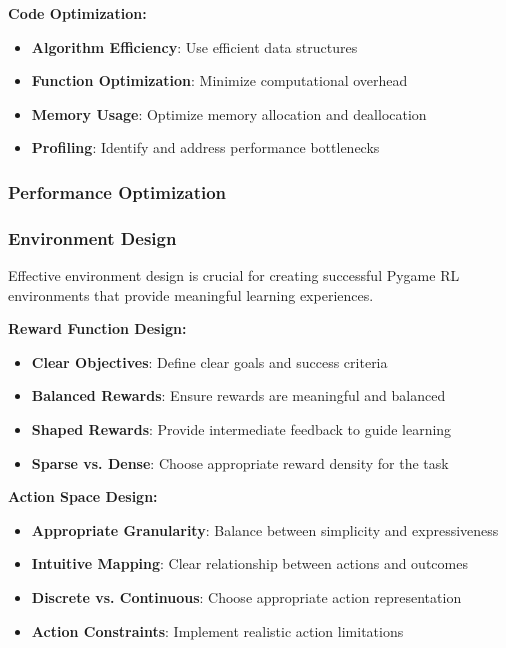 \documentclass[12pt]{article}
\begin{document}
{{{\textbf{Code Optimization:}
\begin{itemize}
    \item \textbf{Algorithm Efficiency}: Use efficient data structures
    \item \textbf{Function Optimization}: Minimize computational overhead
    \item \textbf{Memory Usage}: Optimize memory allocation and deallocation
    \item \textbf{Profiling}: Identify and address performance bottlenecks
\end{itemize}

\subsubsection{Performance Optimization}

\subsubsection{Environment Design}

Effective environment design is crucial for creating successful Pygame RL environments that provide meaningful learning experiences.

\textbf{Reward Function Design:}
\begin{itemize}
    \item \textbf{Clear Objectives}: Define clear goals and success criteria
    \item \textbf{Balanced Rewards}: Ensure rewards are meaningful and balanced
    \item \textbf{Shaped Rewards}: Provide intermediate feedback to guide learning
    \item \textbf{Sparse vs. Dense}: Choose appropriate reward density for the task
\end{itemize}

\textbf{Action Space Design:}
\begin{itemize}
    \item \textbf{Appropriate Granularity}: Balance between simplicity and expressiveness
    \item \textbf{Intuitive Mapping}: Clear relationship between actions and outcomes
    \item \textbf{Discrete vs. Continuous}: Choose appropriate action representation
    \item \textbf{Action Constraints}: Implement realistic action limitations
\end{itemize}

}}}
\end{document}

